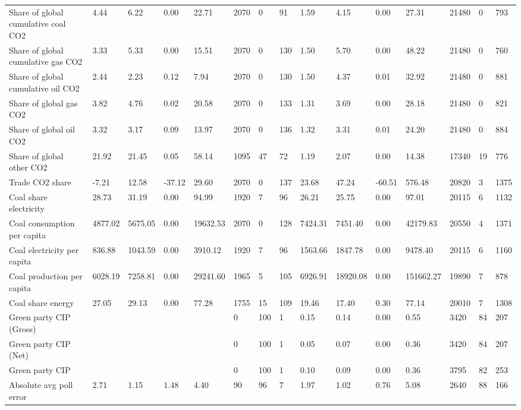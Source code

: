 \begin{longtable}{lllllllllllllll}
Share of global cumulative coal CO2 & 4.44 & 6.22 & 0.00 & 22.71 & 2070 & 0 & 91 & 1.59 & 4.15 & 0.00 & 27.31 & 21480 & 0 & 793\\
Share of global cumulative gas CO2 & 3.33 & 5.33 & 0.00 & 15.51 & 2070 & 0 & 130 & 1.50 & 5.70 & 0.00 & 48.22 & 21480 & 0 & 760\\
\addlinespace
Share of global cumulative oil CO2 & 2.44 & 2.23 & 0.12 & 7.94 & 2070 & 0 & 130 & 1.50 & 4.37 & 0.01 & 32.92 & 21480 & 0 & 881\\
Share of global gas CO2 & 3.82 & 4.76 & 0.02 & 20.58 & 2070 & 0 & 133 & 1.31 & 3.69 & 0.00 & 28.18 & 21480 & 0 & 821\\
Share of global oil CO2 & 3.32 & 3.17 & 0.09 & 13.97 & 2070 & 0 & 136 & 1.32 & 3.31 & 0.01 & 24.20 & 21480 & 0 & 884\\
Share of global other CO2 & 21.92 & 21.45 & 0.05 & 58.14 & 1095 & 47 & 72 & 1.19 & 2.07 & 0.00 & 14.38 & 17340 & 19 & 776\\
Trade CO2 share & -7.21 & 12.58 & -37.12 & 29.60 & 2070 & 0 & 137 & 23.68 & 47.24 & -60.51 & 576.48 & 20820 & 3 & 1375\\
\addlinespace
Coal share electricity & 28.73 & 31.19 & 0.00 & 94.99 & 1920 & 7 & 96 & 26.21 & 25.75 & 0.00 & 97.01 & 20115 & 6 & 1132\\
Coal consumption per capita & 4877.02 & 5675.05 & 0.00 & 19632.53 & 2070 & 0 & 128 & 7424.31 & 7451.40 & 0.00 & 42179.83 & 20550 & 4 & 1371\\
Coal electricity per capita & 836.88 & 1043.59 & 0.00 & 3910.12 & 1920 & 7 & 96 & 1563.66 & 1847.78 & 0.00 & 9478.40 & 20115 & 6 & 1160\\
Coal production per capita & 6028.19 & 7258.81 & 0.00 & 29241.60 & 1965 & 5 & 105 & 6926.91 & 18920.08 & 0.00 & 151662.27 & 19890 & 7 & 878\\
Coal share energy & 27.05 & 29.13 & 0.00 & 77.28 & 1755 & 15 & 109 & 19.46 & 17.40 & 0.30 & 77.14 & 20010 & 7 & 1308\\
\addlinespace
Green party CIP (Gross) &  &  &  &  & 0 & 100 & 1 & 0.15 & 0.14 & 0.00 & 0.55 & 3420 & 84 & 207\\
Green party CIP (Net) &  &  &  &  & 0 & 100 & 1 & 0.05 & 0.07 & 0.00 & 0.36 & 3420 & 84 & 207\\
Green party CIP &  &  &  &  & 0 & 100 & 1 & 0.10 & 0.09 & 0.00 & 0.36 & 3795 & 82 & 253\\
Absolute avg poll error & 2.71 & 1.15 & 1.48 & 4.40 & 90 & 96 & 7 & 1.97 & 1.02 & 0.76 & 5.08 & 2640 & 88 & 166\\

\end{longtable}
